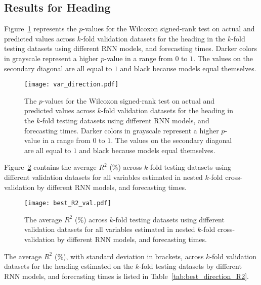 \subsection{Results for Heading}

Figure~\ref{fig:var_direction} represents the $p$-values for the Wilcoxon signed-rank test on actual and predicted values across $k$-fold validation datasets for the heading in the $k$-fold testing datasets using different RNN models, and forecasting times. Darker colors in grayscale represent a higher $p$-value in a range from $0$ to $1$. The values on the secondary diagonal are all equal to $1$ and black because models equal themselves.

\begin{figure}[!ht]
	\centering
	\texttt{[image: var\_direction.pdf]}
	\caption{The $p$-values for the Wilcoxon signed-rank test on actual and predicted values across $k$-fold validation datasets for the heading in the $k$-fold testing datasets using different RNN models, and forecasting times. Darker colors in grayscale represent a higher $p$-value in a range from $0$ to $1$. The values on the secondary diagonal are all equal to $1$ and black because models equal themselves.}
	\label{fig:var_direction}
\end{figure}

Figure~\ref{fig:best_R2_val} contains the average $R^{2}$ (\%) across $k$-fold testing datasets using different validation datasets for all variables estimated in nested $k$-fold cross-validation by different RNN models, and forecasting times.

\begin{figure}[!ht]
	\centering
	\texttt{[image: best\_R2\_val.pdf]}
	\caption{The average $R^{2}$ (\%) across $k$-fold testing datasets using different validation datasets for all variables estimated in nested $k$-fold cross-validation by different RNN models, and forecasting times.}
	\label{fig:best_R2_val}
\end{figure}

The average $R^{2}$ (\%), with standard deviation in brackets, across $k$-fold validation datasets for the heading estimated on the $k$-fold testing datasets by different RNN models, and forecasting times is listed in Table~\ref{tab:best_direction_R2}.


